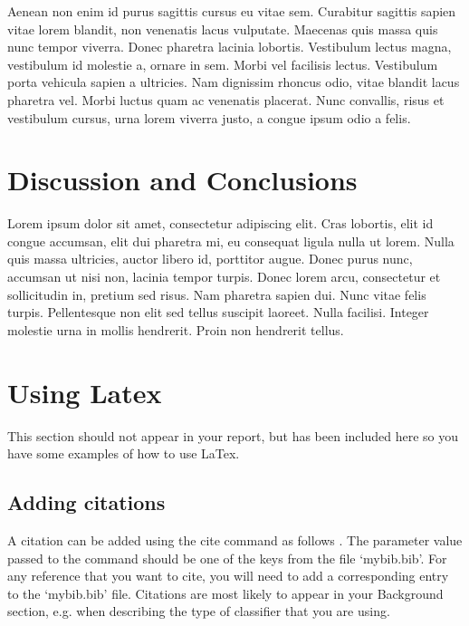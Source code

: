 \documentclass[a4paper]{article}
\begin{document}
Aenean non enim id purus sagittis cursus eu vitae sem. Curabitur sagittis sapien vitae lorem blandit, non venenatis lacus vulputate. Maecenas quis massa quis nunc tempor viverra. Donec pharetra lacinia lobortis. Vestibulum lectus magna, vestibulum id molestie a, ornare in sem. Morbi vel facilisis lectus. Vestibulum porta vehicula sapien a ultricies. Nam dignissim rhoncus odio, vitae blandit lacus pharetra vel. Morbi luctus quam ac venenatis placerat. Nunc convallis, risus et vestibulum cursus, urna lorem viverra justo, a congue ipsum odio a felis.

\section{Discussion and Conclusions}


Lorem ipsum dolor sit amet, consectetur adipiscing elit. Cras lobortis, elit id congue accumsan, elit dui pharetra mi, eu consequat ligula nulla ut lorem. Nulla quis massa ultricies, auctor libero id, porttitor augue. Donec purus nunc, accumsan ut nisi non, lacinia tempor turpis. Donec lorem arcu, consectetur et sollicitudin in, pretium sed risus. Nam pharetra sapien dui. Nunc vitae felis turpis. Pellentesque non elit sed tellus suscipit laoreet. Nulla facilisi. Integer molestie urna in mollis hendrerit. Proin non hendrerit tellus.


\section{Using Latex}

This section should not appear in your report, but has been included here so you have some examples of how to use LaTex.

\subsection{Adding citations}
A citation can be added using the cite command as follows \cite{Davis80-COP}. The parameter value passed to the command should be one of the keys from the file `mybib.bib'. For any reference that you want to cite, you will need to add a corresponding entry to the `mybib.bib' file. Citations are most likely to appear in your Background section, e.g. when describing the type of classifier that you are using.
\end{document}
